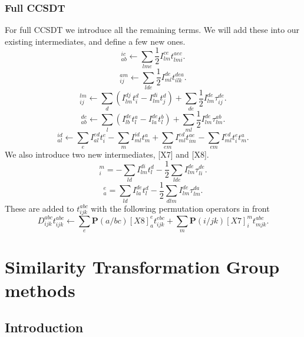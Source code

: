 \documentclass[graybox,sectrefs,envcountresetchap,open=right]{svmonodo}
\begin{document}
\subsection{Full CCSDT}
For full CCSDT we introduce all the remaining terms. We will add these into our existing intermediates, and define a few new ones.
\begin{equation}
[X1]_{ab}^{ic} \leftarrow 
\sum_{lme}
\frac{1}{2}
I_{lm}^{ce} t_{lmi}^{aec} .
\end{equation}
\begin{equation}
[X2]_{ij}^{am} \leftarrow 
\sum_{lde}
\frac{1}{2}
I_{ml}^{de} t_{ilk}^{dea} .
\end{equation}
\begin{equation}
[X3]_{ij}^{lm} \leftarrow
\sum_d \left( I_{lm}^{dj} t_i^d
- I_{lm}^{di} t_j^d \right)
+ \sum_{de} \frac{1}{2} I_{lm}^{de} \tau_{ij}^{de} .
\end{equation}
\begin{equation}
[X4]_{ab}^{de} \leftarrow
\sum_l \left( 
I_{lb}^{de} t_l^a
- I_{la}^{de} t_l^b \right)
+ \sum_{ml} \frac{1}{2} I_{lm}^{de} \tau_{lm}^{ab} .
\end{equation}
\begin{equation}
[X6]_{al}^{id} \leftarrow 
\sum_{e} I_{al}^{ed} t_i^e
- \sum_m I_{ml}^{id} t_m^a
+ \sum_{em} I_{ml}^{ed} t_{im}^{ae}
- \sum_{em} I_{ml}^{ed} t_i^e t_m^a .
\end{equation}
We also introduce two new intermediates, [X7] and [X8].
\begin{equation}
[X7]_i^m = - \sum_{ld} I_{lm}^{di} t_l^d
- \frac{1}{2} \sum_{lde} I_{lm}^{de} \tau_{li}^{de} .
\end{equation}
\begin{equation}
[X8]_a^e = \sum_{ld} I_{la}^{de} t_l^d
- \frac{1}{2} \sum_{dlm} I_{lm}^{de} \tau_{lm}^{da} .
\end{equation}
These are added to $t_{ijk}^{abc}$ with the following permutation operators in front
\begin{equation}
D_{ijk}^{abc} t_{ijk}^{abc} \leftarrow \sum_e \mathbf{P}(a/bc) [X8]_a^e t_{ijk}^{ebc}
+ \sum_m \mathbf{P}(i/jk) [X7]_i^m  
t_{mjk}^{abc} .
\end{equation}


\chapter{Similarity Transformation Group methods}
\label{ch:srg}


\section{Introduction}
\end{document}
